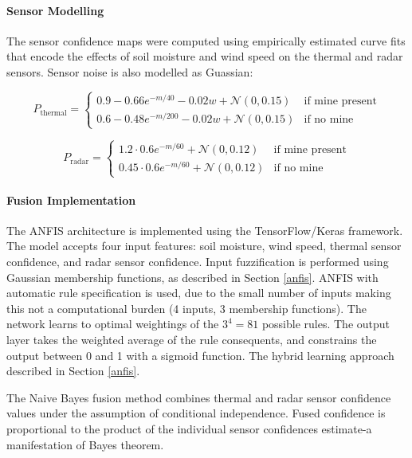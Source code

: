 \paragraph{Sensor Modelling}  

    The sensor confidence maps were computed using empirically estimated curve fits  that encode the effects of soil moisture and wind speed on the thermal and radar sensors. Sensor noise is also modelled as Guassian:
    
    \begin{equation}
        P_{\text{thermal}} = \begin{cases} 
        0.9 - 0.66e^{-m/40} - 0.02w + \mathcal{N}(0,0.15) & \text{if mine present} \\
        0.6 - 0.48e^{-m/200} - 0.02w + \mathcal{N}(0,0.15) & \text{if no mine}
        \end{cases}
    \end{equation}
    
    \begin{equation}
        P_{\text{radar}} = \begin{cases}
        1.2 \cdot 0.6e^{-m/60} + \mathcal{N}(0,0.12) & \text{if mine present} \\
        0.45 \cdot 0.6e^{-m/60} + \mathcal{N}(0,0.12) & \text{if no mine}
        \end{cases}
    \end{equation}

\paragraph{Fusion Implementation}

    The ANFIS architecture is implemented using the TensorFlow/Keras framework. The model accepts four input features: soil moisture, wind speed, thermal sensor confidence, and radar sensor confidence. Input fuzzification is performed using Gaussian membership functions, as described in Section \ref{anfis}. ANFIS with automatic rule specification is used, due to the small number of inputs making this not a computational burden (4 inputs, 3 membership functions). The network learns to optimal weightings of the $3^4=81$ possible rules. The output layer takes the weighted average of the rule consequents, and constrains the output between 0 and 1 with a sigmoid function. The hybrid learning approach described in Section \ref{anfis}.

    The Naive Bayes fusion method combines thermal and radar sensor confidence values under the assumption of conditional independence. Fused confidence is proportional to the product of the individual sensor confidences estimate-a manifestation of Bayes theorem.

